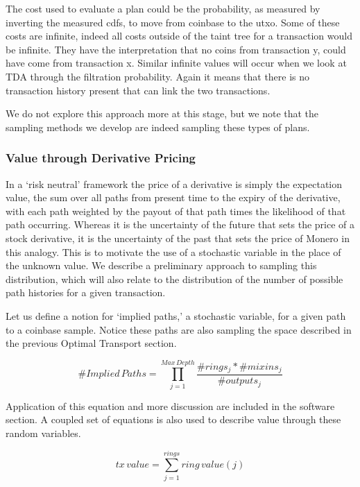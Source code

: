 The cost used to evaluate a plan could be the probability, as measured by inverting the measured cdfs, to move from coinbase to the utxo.
Some of these costs are infinite, indeed all costs outside of the taint tree for a transaction would be infinite.
They have the interpretation that no coins from transaction y, could have come from transaction x.  
Similar infinite values will occur when we look at TDA through the filtration probability.  
Again it means that there is no transaction history present that can link the two transactions.

We do not explore this approach more at this stage, but we note that the sampling methods we develop are indeed sampling these types of plans.

\subsubsection{Value through Derivative Pricing}

In a `risk neutral' framework the price of a derivative is simply the expectation value, the sum over all paths from present time to the expiry of the derivative, with each path weighted by the payout of that path times the likelihood of that path occurring\cite{wilmott2007paul}.   
Whereas it is the uncertainty of the future that sets the price of a stock derivative, it is the uncertainty of the past that sets the price of Monero in this analogy.  
This is to motivate the use of a stochastic variable in the place of the unknown value.  
We describe a preliminary approach to sampling this distribution, which will also relate to the distribution of the number of possible path histories for a given transaction.  

Let us define a notion for `implied paths,' a stochastic variable,  for a given path to a coinbase sample.  Notice these paths are also sampling the space described in the previous Optimal Transport section.

\begin{equation}
\#Implied\, Paths = \prod_{j=1}^{Max\, Depth} \frac{\# rings_j*\#mixins_j}{\#outputs_j}
\end{equation}

Application of this equation and more discussion are included in the software section.
A coupled set of equations is also used to describe value through these random variables.

\begin{equation}
tx\, value = \sum_{j=1}^{rings}ring\, value(j)
\end{equation}

